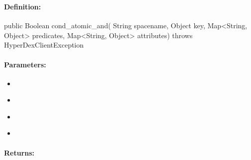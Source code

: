 \subsubsection{}
\label{api:java:cond_atomic_and}


\paragraph{Definition:}
\begin{javacode}
public Boolean cond_atomic_and(
        String spacename,
        Object key,
        Map<String, Object> predicates,
        Map<String, Object> attributes) throws HyperDexClientException
\end{javacode}

\paragraph{Parameters:}
\begin{itemize}[noitemsep]
\item {}\\

\item {}\\

\item {}\\

\item {}\\

\end{itemize}

\paragraph{Returns:}


\pagebreak
\subsubsection{}
\label{api:java:async_cond_atomic_and}



